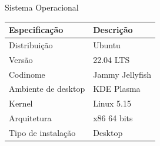 \begin{frame}{Sistema Operacional}
    \centering
    \begin{table}[h]
        \centering
        \begin{tabular}{l|l}
            \textbf{Especificação} & \textbf{Descrição} \\
            \toprule
            Distribuição & Ubuntu \\
            \hline
            Versão & 22.04 LTS  \\
            \hline
            Codinome & Jammy Jellyfish \\
            \hline
            Ambiente de desktop & KDE Plasma \\
            \hline
            Kernel & Linux 5.15 \\
            \hline
            Arquitetura & x86 64 bits \\
            \hline
            Tipo de instalação & Desktop\\
        \end{tabular}
    \end{table}
\end{frame}

